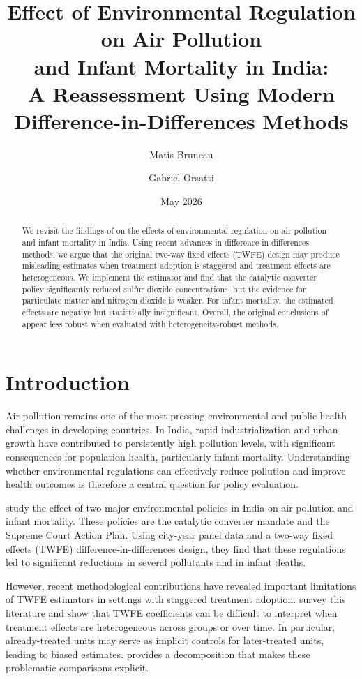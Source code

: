 \documentclass[10pt]{article}
\title{Effect of Environmental Regulation on Air Pollution\\ and Infant Mortality in India:\\
A Reassessment Using Modern Difference-in-Differences Methods}
\author{Matis Bruneau \and Gabriel Orsatti}
\date{May 2026}
\begin{document}
\maketitle

\begin{abstract}
We revisit the findings of \citet{greenstone2014} on the effects of environmental regulation on air pollution and infant mortality in India. Using recent advances in difference-in-differences methods, we argue that the original two-way fixed effects (TWFE) design may produce misleading estimates when treatment adoption is staggered and treatment effects are heterogeneous. We implement the \citet{callaway2021} estimator and find that the catalytic converter policy significantly reduced sulfur dioxide concentrations, but the evidence for particulate matter and nitrogen dioxide is weaker. For infant mortality, the estimated effects are negative but statistically insignificant. Overall, the original conclusions of \citet{greenstone2014} appear less robust when evaluated with heterogeneity-robust methods.
\end{abstract}

\section{Introduction}

Air pollution remains one of the most pressing environmental and public health challenges in developing countries. In India, rapid industrialization and urban growth have contributed to persistently high pollution levels, with significant consequences for population health, particularly infant mortality. Understanding whether environmental regulations can effectively reduce pollution and improve health outcomes is therefore a central question for policy evaluation.

\citet{greenstone2014} study the effect of two major environmental policies in India on air pollution and infant mortality. These policies are the catalytic converter mandate and the Supreme Court Action Plan. Using city-year panel data and a two-way fixed effects (TWFE) difference-in-differences design, they find that these regulations led to significant reductions in several pollutants and in infant deaths.

However, recent methodological contributions have revealed important limitations of TWFE estimators in settings with staggered treatment adoption. \citet{dechaisemartin2023} survey this literature and show that TWFE coefficients can be difficult to interpret when treatment effects are heterogeneous across groups or over time. In particular, already-treated units may serve as implicit controls for later-treated units, leading to biased estimates. \citet{goodman2021} provides a decomposition that makes these problematic comparisons explicit.
\end{document}
